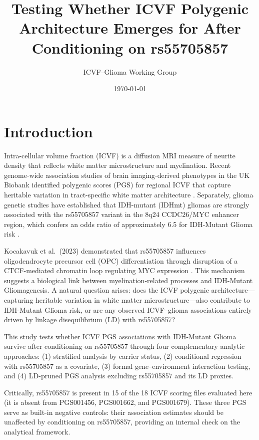 \documentclass[11pt,a4paper]{article}
\title{Testing Whether ICVF Polygenic Architecture Emerges for \phenolabel{} After Conditioning on rs55705857}
\author{ICVF--Glioma Working Group}
\date{\today}
\newcommand{\phenolabel}{IDH-Mutant Glioma}
\begin{document}
\maketitle

\section{Introduction}

Intra-cellular volume fraction (ICVF) is a diffusion MRI measure of neurite density that reflects white matter microstructure and myelination. Recent genome-wide association studies of brain imaging-derived phenotypes in the UK Biobank identified polygenic scores (PGS) for regional ICVF that capture heritable variation in tract-specific white matter architecture \cite{smith2021,elliott2018}. Separately, glioma genetic studies have established that IDH-mutant (IDHmt) gliomas are strongly associated with the rs55705857 variant in the 8q24 CCDC26/MYC enhancer region, which confers an odds ratio of approximately 6.5 for \phenolabel{} risk \cite{melin2017}.

Kocakavuk et al.\ (2023) demonstrated that rs55705857 influences oligodendrocyte precursor cell (OPC) differentiation through disruption of a CTCF-mediated chromatin loop regulating MYC expression \cite{kocakavuk2023}. This mechanism suggests a biological link between myelination-related processes and \phenolabel{}genesis. A natural question arises: does the ICVF polygenic architecture---capturing heritable variation in white matter microstructure---also contribute to \phenolabel{} risk, or are any observed ICVF--glioma associations entirely driven by linkage disequilibrium (LD) with rs55705857?

This study tests whether ICVF PGS associations with \phenolabel{} survive after conditioning on rs55705857 through four complementary analytic approaches: (1) stratified analysis by carrier status, (2) conditional regression with rs55705857 as a covariate, (3) formal gene--environment interaction testing, and (4) LD-pruned PGS analysis excluding rs55705857 and its LD proxies.

Critically, rs55705857 is present in 15 of the 18 ICVF scoring files evaluated here (it is absent from PGS001456, PGS001662, and PGS001679). These three PGS serve as built-in negative controls: their association estimates should be unaffected by conditioning on rs55705857, providing an internal check on the analytical framework.
\end{document}
